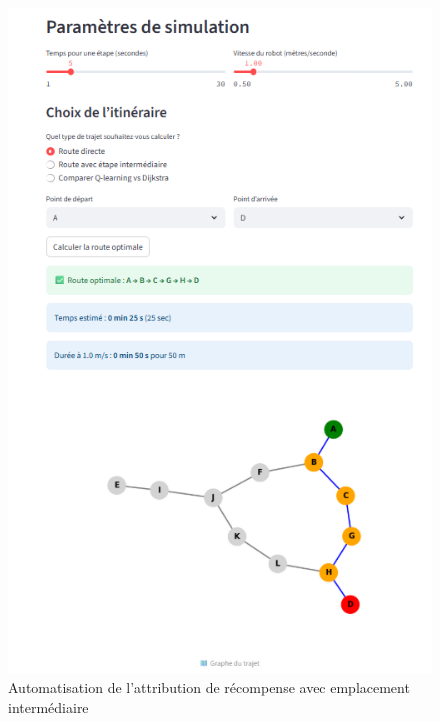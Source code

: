 \documentclass{article}
\begin{document}
\begin{figure}[htbp]
\begin{minipage}[b]{0.45\textwidth}
    \includegraphics[width=\textwidth]{image5.png}
    \caption{Automatisation de l'attribution de récompense avec emplacement intermédiaire}
    \label{fig:Automatisation de l'attribution de récompense avec emplacement intermédiaire}
  \end{minipage}
\end{figure}
\end{document}
